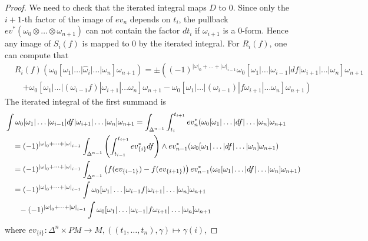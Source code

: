 \documentclass{scrartcl}
\theoremstyle{plain}
\theoremstyle{definition}
\newcommand{\abs}[1]{\left\lvert#1\right\rvert}
\begin{document}
\begin{proof}
    We need to check that the iterated integral maps $D$ to $0$. Since only the $i+1$-th factor of the image of $ev_n$ depends on $t_i$, the pullback $ev^*(\omega_0\otimes\dots\otimes\omega_{n+1})$ can not contain the factor $dt_i$ if $\omega_{i+1}$ is a $0$-form. Hence any image of $S_i(f)$ is mapped to $0$ by the iterated integral. For $R_i(f)$, one can compute that  
    \begin{align*}
        &R_i(f)(\omega_0[\omega_1|\dots|\hat\omega_i|\dots|\omega_{n}]\omega_{n+1}) = \pm \left( (-1)^{\abs\omega_0+\dots+\abs\omega_{i-1}} \omega_0[\omega_1|\dots| \omega_{i-1}| df| \omega_{i+1}|\dots|\omega_{n}]\omega_{n+1} \right.\\&\quad\left. + \omega_0[\omega_1|\dots|(\omega_{i-1}f)|\omega_{i+1}|\dots\omega_n]\omega_{n+1} - \omega_0[\omega_1|\dots|(\omega_{i-1})|f\omega_{i+1}|\dots\omega_n]\omega_{n+1} \right)
    \end{align*}
    The iterated integral of the first summand is 
    \begin{align*}
        &\int \omega_0[\omega_1|\dots| \omega_{i-1}| df| \omega_{i+1}|\dots|\omega_{n}]\omega_{n+1} = \int_{\Delta^{n-1}}\int_{t_i}^{t_{i+1}} ev_{n}^*(\omega_0[\omega_1|\dots|df|\dots|\omega_n]\omega_{n+1} \\
        &\quad= (-1)^{\abs\omega_0+\dots+\abs\omega_{i-1}}\int_{\Delta^{n-1}}\left(\int_{t_{i-1}}^{t_{i+1}} ev_{\{i\}}^*df\right) \wedge ev_{n-1}^*(\omega_0[\omega_1|\dots|df|\dots|\omega_n]\omega_{n+1}) \\
        &\quad= (-1)^{\abs\omega_0+\dots+\abs\omega_{i-1}}\int_{\Delta^{n-1}}\left(f(ev_{\{i-1\}})-f(ev_{\{i+1\}})\right) ev_{n-1}^*(\omega_0[\omega_1|\dots|df|\dots|\omega_n]\omega_{n+1}) \\
        &\quad= (-1)^{\abs\omega_0+\dots+\abs\omega_{i-1}} \int \omega_0[\omega_1|\dots|\omega_{i-1} f|\omega_{i+1}|\dots|\omega_{n}]\omega_{n+1} \\
        &\quad\hphantom{= }-(-1)^{\abs\omega_0+\dots+\abs\omega_{i-1}} \int \omega_0[\omega_1|\dots|\omega_{i-1} |f\omega_{i+1}|\dots|\omega_{n}]\omega_{n+1}
    \end{align*}
    where $ev_{\{i\}}\colon \Delta^n\times PM\to M, \left((t_1, \dots, t_n), \gamma\right)\mapsto \gamma(i)$,
\end{proof}
\end{document}
